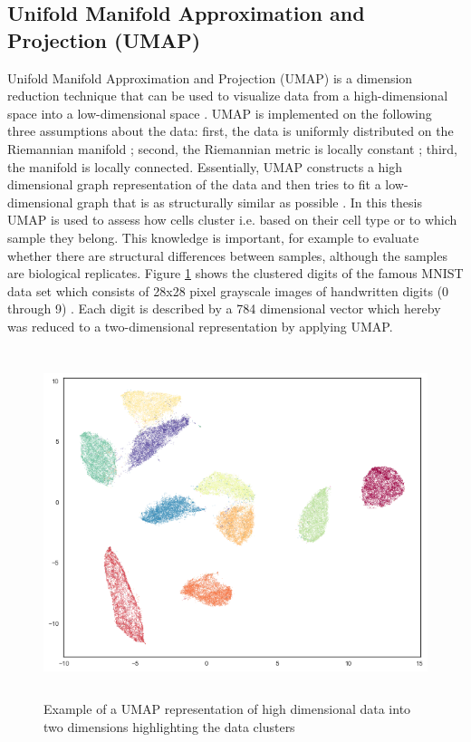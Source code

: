\subsection{Unifold Manifold Approximation and Projection (UMAP)}
Unifold Manifold Approximation and Projection (UMAP) is a dimension reduction technique that can be used to visualize data from a high-dimensional space into a low-dimensional space \citep{umap}. UMAP is implemented on the following three assumptions about the data: first, the data is uniformly distributed on the Riemannian manifold \citep{riemann}; second, the Riemannian metric is locally constant \citep{riemann}; third, the manifold is locally connected. Essentially, UMAP constructs a high dimensional graph representation of the data and then tries to fit a low-dimensional graph that is as structurally similar as possible \citep{umap}. In this thesis UMAP is used to assess how cells cluster i.e. based on their cell type or to which sample they belong. This knowledge is important, for example to evaluate whether there are structural differences between samples, although the samples are biological replicates. Figure \ref{fig:umap} shows the clustered digits of the famous MNIST data set which consists of 28x28 pixel grayscale images of handwritten digits (0 through 9) \citep{mnist}. Each digit is described by a 784 dimensional vector which hereby was reduced to a two-dimensional representation by applying UMAP.

\begin{figure}[!htb]
\begin{center}
\includegraphics[width=6in,height=4in]{../figures/umap.png}
\end{center}
\caption{Example of a UMAP representation of high dimensional data into two dimensions highlighting the data clusters \citep{umap_implementation}}
\label{fig:umap}
\end{figure}
\FloatBarrier


